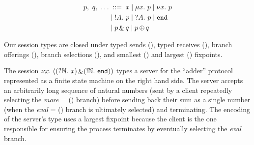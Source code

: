 \documentclass{easychair}
\begin{document}
\noindent
\begin{wrapfigure}{r}{.5\textwidth}\centering%
  \vspace{-1cm}%
  \begin{align*}%
  p,~ q,~ \dots &
    \; ::= \; \recvar{x}
    \; | \; \smallest{x}{p}
    \; | \; \largest{x}{p} \\
    &
    \; | \; \send{A}{p}
    \; | \; \recv{A}{p}
    \; | \; \stopsesh{} \\
    &
    \; | \; \offer{p}{q}
    \; | \; \select{p}{q}
  \end{align*}

  \vspace{.5cm}


  \vspace{1cm}

\end{wrapfigure}
%
Our session types are closed
under typed sends (),
typed receives (),
branch offerings (\offer{\cdot}{\cdot}),
branch selections (\select{\cdot}{\cdot}),
and smallest ()
and largest () fixpoints.

The session
$
\nu x.~((?\mathbb{N}.~\mathit{x}) \mathop{\&} (!\mathbb{N}.~\mathtt{end}))
$
types a server for the ``adder'' protocol represented as
a finite state machine on the right hand side.
%
The server accepts an arbitrarily long sequence of natural numbers
(sent by a client repeatedly selecting the
\emph{more} = () branch)
before sending back their sum as a single number
(when the \emph{eval} = (\send{\nat}{\stopsesh}) branch is ultimately selected)
and terminating.
%
The encoding of the server's type uses a largest fixpoint
because the client is the one responsible
for ensuring the process terminates by eventually selecting
the \emph{eval} branch.
\end{document}
